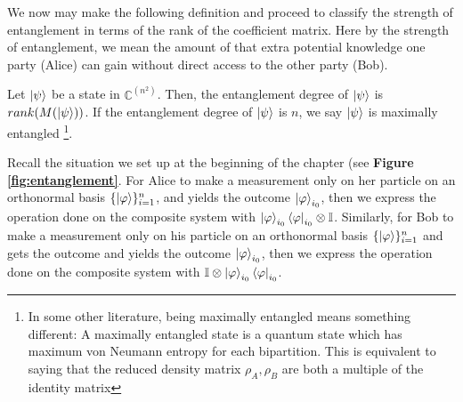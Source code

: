 We now may make the following definition and proceed to classify the strength of entanglement in terms of the rank of the coefficient matrix. Here by the strength of entanglement, we mean the amount of that extra potential knowledge one party (Alice) can gain without direct access to the other party (Bob).

\begin{definition} \label{def: maximally entangled}
 Let $\ket{\psi}$ be a state in ${\mathbb{C}}^{(n^2)}$.  Then, the entanglement degree of $\ket{\psi}$ is $rank(M(\ket{\psi}))$.  If the entanglement degree of $\ket{\psi}$ is $n$, we say $\ket{\psi}$ is maximally entangled \footnote{In some other literature, being maximally entangled means something different: A maximally entangled state is a quantum state which has maximum von Neumann entropy for each bipartition. This is equivalent to saying that the reduced density matrix $\rho_A, \rho_B$ are both a multiple of the identity matrix}.
\end{definition}


Recall the situation we set up at the beginning of the chapter (see \textbf{Figure \ref{fig:entanglement}}. For Alice to make a measurement only on her particle on an orthonormal basis $\{\ket{\varphi}\}_{i=1}^n$, and yields the outcome $\ket{\varphi}_{i_0}$, then we express the operation done on the composite system with  $\ket{\varphi}_{i_0} \bra{\varphi}_{i_0} \otimes \mathbb{I}$. Similarly, for Bob to make a measurement only on his particle on an orthonormal basis $\{\ket{\varphi}\}_{i=1}^n$ and gets the outcome and yields the outcome $\ket{\varphi}_{i_0}$, then we express the operation done on the composite system with  $ \mathbb{I} \otimes \ket{\varphi}_{i_0} \bra{\varphi}_{i_0}$.

